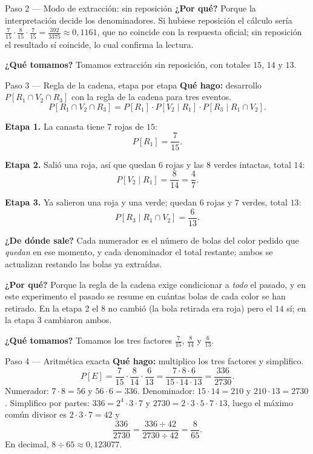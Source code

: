 \documentclass[11pt]{article}
\begin{document}
\begin{sol}
\begin{paso}{Paso 2 --- Modo de extracci\'on: sin reposici\'on}
\textbf{¿Por qu\'e?} Porque la interpretaci\'on decide los denominadores. Si hubiese reposici\'on el c\'alculo ser\'ia $\frac{7}{15}\cdot\frac{8}{15}\cdot\frac{7}{15}=\frac{392}{3375}\approx 0{,}1161$, que no coincide con la respuesta oficial; sin reposici\'on el resultado s\'i coincide, lo cual confirma la lectura.

\textbf{¿Qu\'e tomamos?} Tomamos extracci\'on sin reposici\'on, con totales $15$, $14$ y $13$.
\end{paso}

\begin{paso}{Paso 3 --- Regla de la cadena, etapa por etapa}
\textbf{Qu\'e hago:} desarrollo $P[R_1\cap V_2\cap R_3]$ con la regla de la cadena para tres eventos.
\[
P[R_1\cap V_2\cap R_3]=P[R_1]\cdot P[V_2\mid R_1]\cdot P[R_3\mid R_1\cap V_2].
\]

\textbf{Etapa 1.} La canasta tiene $7$ rojas de $15$:
\[
P[R_1]=\frac{7}{15}.
\]

\textbf{Etapa 2.} Sali\'o una roja, as\'i que quedan $6$ rojas y las $8$ verdes intactas, total $14$:
\[
P[V_2\mid R_1]=\frac{8}{14}=\frac{4}{7}.
\]

\textbf{Etapa 3.} Ya salieron una roja y una verde; quedan $6$ rojas y $7$ verdes, total $13$:
\[
P[R_3\mid R_1\cap V_2]=\frac{6}{13}.
\]

\textbf{¿De d\'onde sale?} Cada numerador es el n\'umero de bolas del color pedido que \emph{quedan} en ese momento, y cada denominador el total restante; ambos se actualizan restando las bolas ya extra\'idas.

\textbf{¿Por qu\'e?} Porque la regla de la cadena exige condicionar a \emph{todo} el pasado, y en este experimento el pasado se resume en cu\'antas bolas de cada color se han retirado. En la etapa 2 el $8$ no cambi\'o (la bola retirada era roja) pero el $14$ s\'i; en la etapa 3 cambiaron ambos.

\textbf{¿Qu\'e tomamos?} Tomamos los tres factores $\frac{7}{15}$, $\frac{8}{14}$ y $\frac{6}{13}$.
\end{paso}

\begin{paso}{Paso 4 --- Aritm\'etica exacta}
\textbf{Qu\'e hago:} multiplico los tres factores y simplifico.
\[
P[E]=\frac{7}{15}\cdot\frac{8}{14}\cdot\frac{6}{13}
=\frac{7\cdot 8\cdot 6}{15\cdot 14\cdot 13}
=\frac{336}{2730}.
\]
Numerador: $7\cdot 8=56$ y $56\cdot 6=336$. Denominador: $15\cdot 14=210$ y $210\cdot 13=2730$. Simplifico por partes: $336=2^{4}\cdot 3\cdot 7$ y $2730=2\cdot 3\cdot 5\cdot 7\cdot 13$, luego el m\'aximo com\'un divisor es $2\cdot 3\cdot 7=42$ y
\[
\frac{336}{2730}=\frac{336\div 42}{2730\div 42}=\frac{8}{65}.
\]
En decimal, $8\div 65\approx 0{,}123077$.


\end{paso}
\end{sol}
\end{document}
